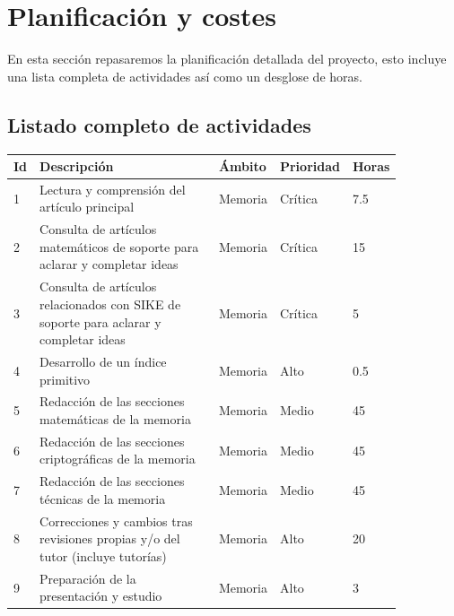 \chapter{Planificación y costes}\label{planificacion}

En esta sección repasaremos la planificación detallada del proyecto, esto incluye una lista completa de actividades así como un desglose de horas.

\section{Listado completo de actividades}

\renewcommand{\arraystretch}{1.5}
\begin{longtable}{|p{0.03\linewidth}|p{0.52\linewidth}|p{0.105\linewidth}|p{0.1\linewidth}|p{0.1\linewidth}|}

    \hline \textbf{Id} & \textbf{Descripción} & \textbf{Ámbito} & \textbf{Prioridad}  & \textbf{Horas}\\ \hline \endhead
    
    1 & Lectura y comprensión del artículo principal & Memoria & Crítica & 7.5 \\ \hline
    2 & Consulta de artículos matemáticos de soporte para aclarar y completar ideas & Memoria & Crítica & 15 \\ \hline
    3 & Consulta de artículos relacionados con SIKE de soporte para aclarar y completar ideas & Memoria & Crítica & 5 \\ \hline
    4 & Desarrollo de un índice primitivo & Memoria & Alto & 0.5 \\ \hline
    5 & Redacción de las secciones matemáticas de la memoria & Memoria & Medio & 45 \\ \hline
    6 & Redacción de las secciones criptográficas de la memoria & Memoria & Medio & 45 \\ \hline
    7 & Redacción de las secciones técnicas de la memoria & Memoria & Medio & 45 \\ \hline
    8 & Correcciones y cambios tras revisiones propias y/o del tutor (incluye tutorías) & Memoria & Alto & 20 \\ \hline
    9 & Preparación de la presentación y estudio & Memoria & Alto & 3 \\ \hline


\end{longtable}
